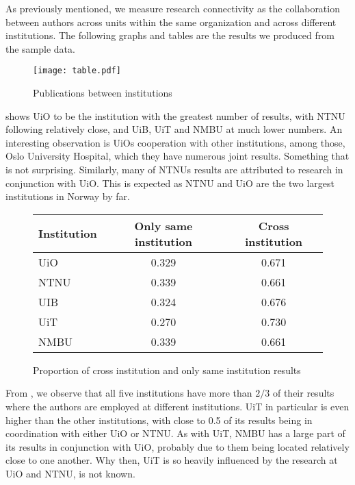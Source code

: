 As previously mentioned, we measure research connectivity as the collaboration between authors across units within the same organization and across different institutions. The following graphs and tables are the results we produced from the sample data.

\begin{figure}[h]
  \centering
  \texttt{[image: table.pdf]}
  \caption{Publications between institutions}
  \label{fig:result}
\end{figure}

 shows UiO to be the institution with the greatest number of results, with NTNU following relatively close, and UiB, UiT and NMBU at much lower numbers.
An interesting observation is UiOs cooperation with other institutions, among those, Oslo University Hospital, which they have numerous joint results. Something that is not surprising.
Similarly, many of NTNUs results are attributed to research in conjunction with UiO. This is expected as NTNU and UiO are the two largest institutions in Norway by far.


\begin{figure}[h]
	\centering
	\begin{tabular}{| l || c | c |}
		\hline
		Institution	& Only same institution	& Cross institution	\\ \hline
		UiO		& 0.329			& 0.671			\\
		NTNU		& 0.339			& 0.661			\\
		UIB		& 0.324			& 0.676			\\
		UiT		& 0.270			& 0.730			\\
		NMBU		& 0.339			& 0.661			\\
		\hline
	\end{tabular}
	\caption{Proportion of cross institution and only same institution results}
	\label{tab:institution-proportion}
\end{figure}

From , we observe that all five institutions have more than $2/3$ of their results where the authors are employed at different institutions. UiT in particular is even higher than the other institutions, with close to 0.5 of its results being in coordination with either UiO or NTNU. As with UiT, NMBU has a large part of its results in conjunction with UiO, probably due to them being located relatively close to one another. Why then, UiT is so heavily influenced by the research at UiO and NTNU, is not known.

